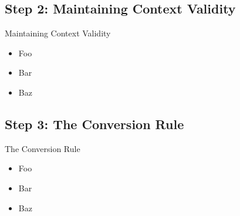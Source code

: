 \documentclass{beamer}
\begin{document}
\subsection{Step 2: Maintaining Context Validity}

\begin{frame}{Maintaining Context Validity}

  \begin{itemize}
    \item
      Foo
    \item
      Bar
    \item
      Baz
  \end{itemize}

\end{frame}


\subsection{Step 3: The Conversion Rule}

\begin{frame}{The Conversion Rule}

  \begin{itemize}
    \item
      Foo
    \item
      Bar
    \item
      Baz
  \end{itemize}

\end{frame}







\end{document}

